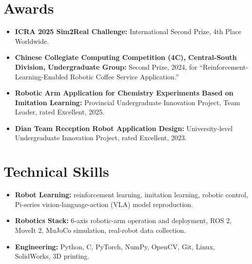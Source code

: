 \documentclass[10pt, a4paper]{article}
\begin{document}
\section{Awards}
\begin{itemize}
    \item \textbf{ICRA 2025 Sim2Real Challenge:} International Second Prize, 4th Place Worldwide.
    \item \textbf{Chinese Collegiate Computing Competition (4C), Central-South Division, Undergraduate Group:} Second Prize, 2024, for ``Reinforcement-Learning-Enabled Robotic Coffee Service Application.''
    \item \textbf{Robotic Arm Application for Chemistry Experiments Based on Imitation Learning:} Provincial Undergraduate Innovation Project, Team Leader, rated Excellent, 2025.
    \item \textbf{Dian Team Reception Robot Application Design:} University-level Undergraduate Innovation Project, rated Excellent, 2023.
\end{itemize}

\section{Technical Skills}
\begin{itemize}
    \item \textbf{Robot Learning:} reinforcement learning, imitation learning, robotic control, Pi-series vision-language-action (VLA) model reproduction.
    \item \textbf{Robotics Stack:} 6-axis robotic-arm operation and deployment, ROS 2, MoveIt 2, MuJoCo simulation, real-robot data collection.
    \item \textbf{Engineering:} Python, C, PyTorch, NumPy, OpenCV, Git, Linux, SolidWorks, 3D printing.
\end{itemize}
\end{document}
